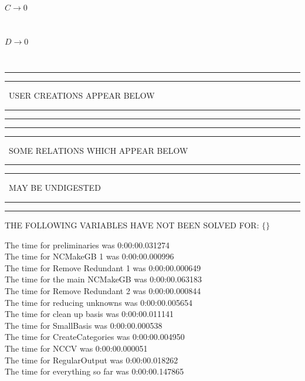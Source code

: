 \documentclass[rep10,leqno]{report}
\begin{document}
\begin{minipage}{6in}
$
C\rightarrow 0
$
\end{minipage}\medskip\\
\begin{minipage}{6in}
$
D\rightarrow 0
$
\end{minipage}\medskip\\
\rule[2pt]{6in}{1pt}\hfil\break
\rule[2.5pt]{1.701in}{1pt}
\ USER CREATIONS APPEAR BELOW\ 
\rule[2.5pt]{1.701in}{1pt}\hfil\break
\rule[2pt]{6in}{1pt}\hfil\break
\rule[2pt]{6in}{4pt}\hfil\break
\rule[2pt]{1.45in}{4pt}
\ SOME RELATIONS WHICH APPEAR BELOW\ 
\rule[2pt]{1.45in}{4pt}\hfil\break
\rule[2pt]{2.18in}{4pt}
\ MAY BE UNDIGESTED\ 
\rule[2pt]{2.18in}{4pt}\hfil\break
\rule[2pt]{6in}{4pt}\hfil\break
THE FOLLOWING VARIABLES HAVE NOT BEEN SOLVED FOR:\hfil\break
$\{\}$
\smallskip\\
\vspace{10pt}

\noindent
The time for preliminaries was 0:00:00.031274\\
The time for NCMakeGB 1 was 0:00:00.000996\\
The time for Remove Redundant 1 was 0:00:00.000649\\
The time for the main NCMakeGB was 0:00:00.063183\\
The time for Remove Redundant 2 was 0:00:00.000844\\
The time for reducing unknowns was 0:00:00.005654\\
The time for clean up basis was 0:00:00.011141\\
The time for SmallBasis was 0:00:00.000538\\
The time for CreateCategories was 0:00:00.004950\\
The time for NCCV was 0:00:00.000051\\
The time for RegularOutput was 0:00:00.018262\\
The time for everything so far was 0:00:00.147865\\
\end{document}
